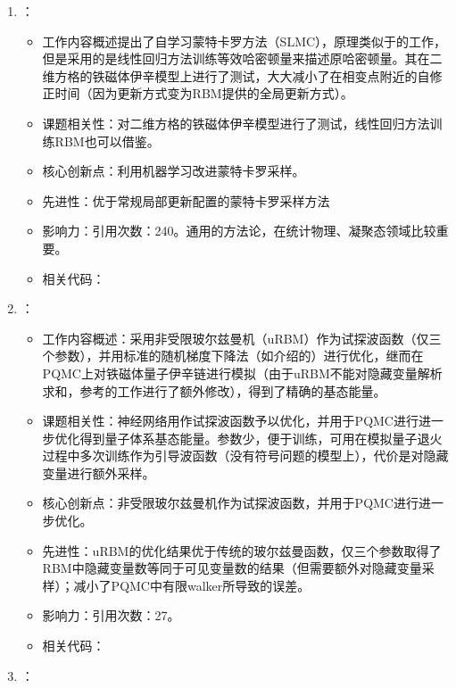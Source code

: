 \begin{enumerate}
\begin{itemize}
        \end{itemize}
        \item \citet{liu2017self}：
        \begin{itemize}
            \item 工作内容概述提出了自学习蒙特卡罗方法（SLMC），原理类似于\citet{huang2017accelerated}的工作，但是采用的是线性回归方法训练等效哈密顿量来描述原哈密顿量。其在二维方格的铁磁体伊辛模型上进行了测试，大大减小了在相变点附近的自修正时间（因为更新方式变为RBM提供的全局更新方式）。
            \item 课题相关性：对二维方格的铁磁体伊辛模型进行了测试，线性回归方法训练RBM也可以借鉴。
            \item 核心创新点：利用机器学习改进蒙特卡罗采样。
            \item 先进性：优于常规局部更新配置的蒙特卡罗采样方法
            \item 影响力：引用次数：240。通用的方法论，在统计物理、凝聚态领域比较重要。
            \item 相关代码：
        \end{itemize}
        \item \citet{inack2018projective}：
            \begin{itemize}
                \item 工作内容概述：采用非受限玻尔兹曼机（uRBM）作为试探波函数（仅三个参数），并用标准的随机梯度下降法（如\citet{becca2017quantum}介绍的）进行优化，继而在PQMC上对铁磁体量子伊辛链进行模拟（由于uRBM不能对隐藏变量解析求和，参考\citet{vitiello1991green}的工作进行了额外修改），得到了精确的基态能量。
                \item 课题相关性：神经网络用作试探波函数予以优化，并用于PQMC进行进一步优化得到量子体系基态能量。参数少，便于训练，可用在模拟量子退火过程中多次训练作为引导波函数（没有符号问题的模型上），代价是对隐藏变量进行额外采样。
                \item 核心创新点：非受限玻尔兹曼机作为试探波函数，并用于PQMC进行进一步优化。
                \item 先进性：uRBM的优化结果优于传统的玻尔兹曼函数，仅三个参数取得了RBM中隐藏变量数等同于可见变量数的结果（但需要额外对隐藏变量采样）；减小了PQMC中有限walker所导致的误差。
                \item 影响力：引用次数：27。
                \item 相关代码：
            \end{itemize}
        \item \citet{saito2018machine}：
            \begin{itemize}

\end{itemize}
\end{enumerate}
